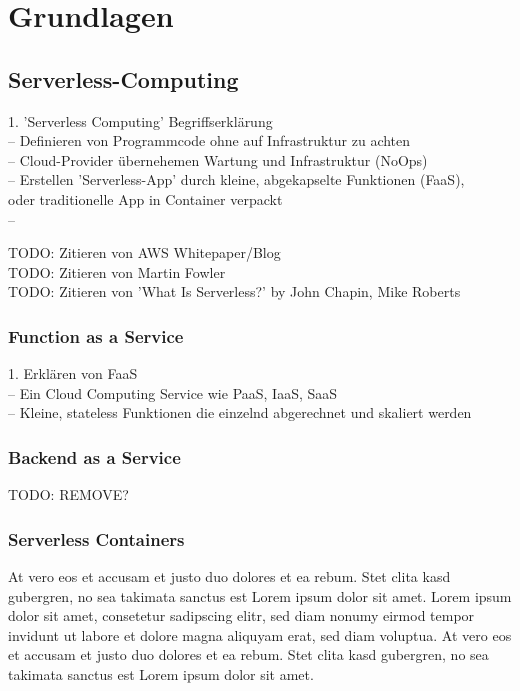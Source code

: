 \chapter{Grundlagen}

\section{Serverless-Computing}
1. 'Serverless Computing' Begriffserklärung\\
-- Definieren von Programmcode ohne auf Infrastruktur zu achten\\
-- Cloud-Provider übernehemen Wartung und Infrastruktur (NoOps)\\
-- Erstellen 'Serverless-App' durch kleine, abgekapselte Funktionen (FaaS),\\
oder traditionelle App in Container verpackt\\
--

TODO: Zitieren von AWS Whitepaper/Blog\\
TODO: Zitieren von Martin Fowler\\
TODO: Zitieren von 'What Is Serverless?' by John Chapin, Mike Roberts\\


\subsection{Function as a Service}
1. Erklären von FaaS\\
-- Ein Cloud Computing Service wie PaaS, IaaS, SaaS\\
-- Kleine, stateless Funktionen die einzelnd abgerechnet und skaliert werden\\


\subsection{Backend as a Service}
TODO: REMOVE?

\subsection{Serverless Containers}
At vero eos et accusam et justo duo dolores et ea rebum. Stet clita kasd gubergren,
no sea takimata sanctus est Lorem ipsum dolor sit amet. Lorem ipsum dolor sit amet,
consetetur sadipscing elitr, sed diam nonumy eirmod tempor invidunt ut labore et
dolore magna aliquyam erat, sed diam voluptua.
At vero eos et accusam et justo duo dolores et ea rebum.
Stet clita kasd gubergren, no sea takimata sanctus est Lorem ipsum dolor sit amet.



